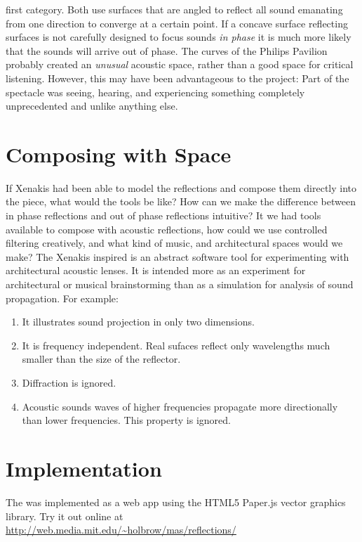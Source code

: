 first category. Both use surfaces that are angled to reflect all sound
emanating from one direction to converge at a certain point. If a
concave surface reflecting surfaces is not carefully designed to focus
sounds \textit{in phase} it is much more likely that the sounds will
arrive out of phase. The curves of the Philips Pavilion probably
created an \emph{unusual} acoustic space, rather than a good space for
critical listening. However, this may have been advantageous to the
project: Part of the spectacle was seeing, hearing, and experiencing
something completely unprecedented and unlike anything else.

\section{Composing with Space}
\label{sec:composing-with-space}
If Xenakis had been able to model the reflections and compose them
directly into the piece, what would the tools be like? How can we make
the difference between in phase reflections and out of phase
reflections intuitive?  It we had tools available to compose with
acoustic reflections, how could we use controlled filtering
creatively, and what kind of music, and architectural spaces would we
make? The Xenakis inspired  is an abstract software tool for
experimenting with architectural acoustic lenses. It is intended more
as an experiment for architectural or musical brainstorming than as a
simulation for analysis of sound propagation. For example:
\begin{enumerate}
\item It illustrates sound projection in only two dimensions.
\item It is frequency independent. Real sufaces reflect only
  wavelengths much smaller than the size of the
  reflector.\cite{Zhixin2005} 
\item Diffraction is ignored. 
\item Acoustic sounds waves of higher frequencies propagate more
  directionally than lower frequencies. This property is ignored.
\end{enumerate}

\section{Implementation}
\label{sec:refmod-implementation}
The  was implemented as a web app using the HTML5
Paper.js vector graphics
library. Try it out online at\\
\noindent \url{http://web.media.mit.edu/~holbrow/mas/reflections/}

